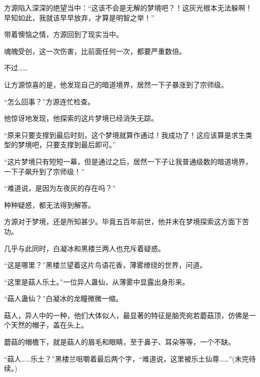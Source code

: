 \begin{this_body}
方源陷入深深的绝望当中：“这该不会是无解的梦境吧？！这灰光根本无法躲啊！早知如此，我就该早早放弃，才算是明智之举！”

带着懊恼之情，方源回到了现实当中。

魂魄受创，这一次伤害，比前面任何一次，都要严重数倍。

不过……

让方源惊喜的是，他发现自己的暗道境界，居然一下子暴涨到了宗师级。

“怎么回事？”方源连忙检查。

他惊讶地发现，他探索的这片梦境已经消失无踪。

“原来只要支撑到最后时刻，这个梦境就算作通过！我成功了！这应该算是求生类型的梦境吧，只要支撑到最后即可。”

“这片梦境只有短短一幕，但是通过之后，居然一下子让我普通级数的暗道境界，一下子飙升到了宗师级！”

“难道说，是因为左夜灰的存在吗？”

种种疑惑，都无法得到解答。

方源对于梦境，还是所知甚少。毕竟五百年前世，他并未在梦境探索这方面下苦功。

几乎与此同时，白凝冰和黑楼兰两人也充斥着疑惑。

“这是哪里？”黑楼兰望着这片鸟语花香，薄雾缭绕的世界，问道。

“这里是菇人乐土。”一位异人蛊仙，从薄雾中显露出身形来。

“菇人蛊仙？”白凝冰的龙瞳微微一缩。

菇人，异人中的一种，他们大体似人，最显著的特征是脑壳宛若蘑菇顶，仿佛是一个天然的帽子，盖在头上。

蘑菇的帽檐下，就是菇人的眉毛和眼睛，至于鼻子、耳朵等等，一个不缺。

“菇人……乐土？”黑楼兰咀嚼着最后两个字，“难道说，这里被乐土仙尊……”(未完待续。)

\end{this_body}

